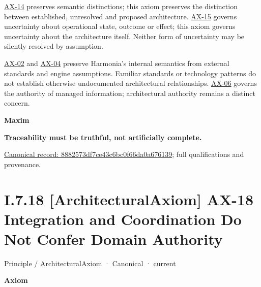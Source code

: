 \hyperref[element:d3fc6025dc7646d1b2020b51f7a44bfa]{AX-14} preserves semantic
distinctions; this axiom preserves the distinction between established,
unresolved and proposed architecture.
\hyperref[element:ef8abbaec37e4890ad78b9f263e67906]{AX-15} governs uncertainty
about operational state, outcome or effect; this axiom governs uncertainty
about the architecture itself. Neither form of uncertainty may be silently
resolved by assumption.



\hyperref[element:eee8c3783d964d18a7f9dcea85fcd4cf]{AX-02}
and \hyperref[element:54508cda80484a6caf95b901780eaf7d]{AX-04}
preserve Harmonia's internal semantics from external standards and engine
assumptions. Familiar standards or technology patterns do not establish
otherwise undocumented architectural relationships.
\hyperref[element:952c3b6148ce4fce94b69f99a0c2fec7]{AX-06} governs the authority
of managed information; architectural authority remains a distinct concern.



\par\medskip\textbf{Maxim}\par


\textbf{Traceability must be truthful, not artificially complete.}


{\footnotesize \href{../../../../../../../../continuum/motivation/principle/architectural-axiom/8882573df7ce43c6bc0f66da0a676139.md}{Canonical record: 8882573df7ce43c6bc0f66da0a676139}; full qualifications and provenance.}\par
\section*{I.7.18 [ArchitecturalAxiom] AX-18 Integration and Coordination Do Not Confer Domain Authority}
\label{navigation:I.7.18}

\label{element:b8cafe3cf5904d2bb9a9767260fddf78}
{\small Principle / ArchitecturalAxiom · Canonical · current}\par

\par\medskip\textbf{Axiom}\par


